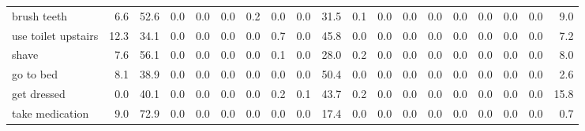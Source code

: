 \documentclass{article}
\begin{document}
\begin{sideways}
\begin{tabular}{lrrrrrrrrrrrrrrrrrr}
brush teeth                   &         6.6 &               52.6 &           0.0 &                          0.0 &                0.0 &                0.2 &                        0.0 &          0.0 &             31.5 &                0.1 &                    0.0 &                      0.0 &                  0.0 &                   0.0 &              0.0 &              0.0 &                                  0.0 &          9.0 \\
use toilet upstairs           &        12.3 &               34.1 &           0.0 &                          0.0 &                0.0 &                0.0 &                        0.7 &          0.0 &             45.8 &                0.0 &                    0.0 &                      0.0 &                  0.0 &                   0.0 &              0.0 &              0.0 &                                  0.0 &          7.2 \\
shave                         &         7.6 &               56.1 &           0.0 &                          0.0 &                0.0 &                0.0 &                        0.1 &          0.0 &             28.0 &                0.2 &                    0.0 &                      0.0 &                  0.0 &                   0.0 &              0.0 &              0.0 &                                  0.0 &          8.0 \\
go to bed                     &         8.1 &               38.9 &           0.0 &                          0.0 &                0.0 &                0.0 &                        0.0 &          0.0 &             50.4 &                0.0 &                    0.0 &                      0.0 &                  0.0 &                   0.0 &              0.0 &              0.0 &                                  0.0 &          2.6 \\
get dressed                   &         0.0 &               40.1 &           0.0 &                          0.0 &                0.0 &                0.0 &                        0.2 &          0.1 &             43.7 &                0.2 &                    0.0 &                      0.0 &                  0.0 &                   0.0 &              0.0 &              0.0 &                                  0.0 &         15.8 \\
take medication               &         9.0 &               72.9 &           0.0 &                          0.0 &                0.0 &                0.0 &                        0.0 &          0.0 &             17.4 &                0.0 &                    0.0 &                      0.0 &                  0.0 &                   0.0 &              0.0 &              0.0 &                                  0.0 &          0.7 \\

\end{tabular}
\end{sideways}
\end{document}
